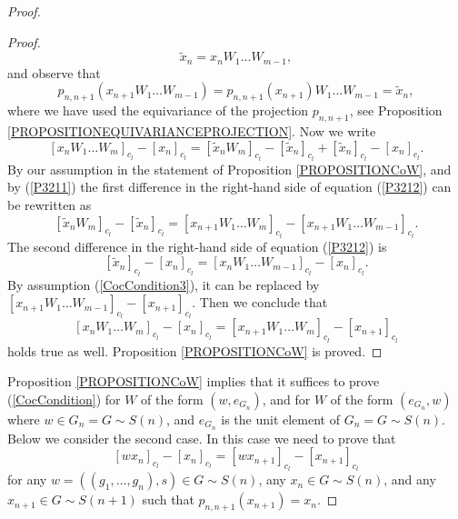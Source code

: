\documentclass[12pt]{amsart}
\theoremstyle{definition}
\numberwithin{equation}{section}
\begin{document}
\begin{proof}
\begin{proof}
$$
\tilde{x}_n=x_nW_1\ldots W_{m-1},
$$
and observe that
\begin{equation}\label{P3211}
p_{n,n+1}\left(x_{n+1}W_1\ldots W_{m-1}\right)=p_{n,n+1}\left(x_{n+1}\right)W_1\ldots W_{m-1}=\tilde{x}_n,
\end{equation}
where we have used the equivariance of the projection $p_{n,n+1}$, see Proposition \ref{PROPOSITIONEQUIVARIANCEPROJECTION}. Now we write
\begin{equation}\label{P3212}
\left[x_nW_1\ldots W_{m}\right]_{c_l}-\left[x_n\right]_{c_l}=\left[\tilde{x}_nW_m\right]_{c_l}-\left[\tilde{x}_n\right]_{c_l}+\left[\tilde{x}_n\right]_{c_l}-\left[x_n\right]_{c_l}.
\end{equation}
By our assumption in the statement of  Proposition \ref{PROPOSITIONCoW}, and by (\ref{P3211}) the first difference in the right-hand side of equation (\ref{P3212}) can be rewritten as
\begin{equation}\label{P3213}
\left[\tilde{x}_nW_m\right]_{c_l}-\left[\tilde{x}_n\right]_{c_l}=\left[x_{n+1}W_1\ldots W_m\right]_{c_l}-\left[x_{n+1}W_1\ldots W_{m-1}\right]_{c_l}.
\end{equation}
The second difference in the right-hand side of equation (\ref{P3212}) is
\begin{equation}\label{P3214}
\left[\tilde{x}_n\right]_{c_l}-\left[x_n\right]_{c_l}=\left[x_nW_1\ldots W_{m-1}\right]_{c_l}-\left[x_n\right]_{c_l}.
\end{equation}
By assumption (\ref{CocCondition3}), it can be replaced by $\left[x_{n+1}W_1\ldots W_{m-1}\right]_{c_l}-\left[x_{n+1}\right]_{c_l}$. Then we conclude that
$$
\left[x_nW_1\ldots W_{m}\right]_{c_l}-\left[x_n\right]_{c_l}=\left[x_{n+1}W_1\ldots W_{m}\right]_{c_l}-\left[x_{n+1}\right]_{c_l}
$$
holds true as well. Proposition \ref{PROPOSITIONCoW} is proved.
\end{proof}
Proposition \ref{PROPOSITIONCoW} implies that it suffices to prove (\ref{CocCondition})
for $W$ of the form $\left(w,e_{G_n}\right)$, and for $W$ of the form $\left(e_{G_n},w\right)$
where $w\in G_n=G\sim S(n)$, and $e_{G_n}$ is the unit element of $G_n=G\sim S(n)$. Below we consider the second case. In this case we need to prove that
\begin{equation}
\left[wx_n\right]_{c_l}-\left[x_n\right]_{c_l}=\left[wx_{n+1}\right]_{c_l}-\left[x_{n+1}\right]_{c_l}
\end{equation}
for any $w=\left(\left(g_1,\ldots,g_n\right),s\right)\in G\sim S(n)$, any $x_n\in G\sim S(n)$, and any $x_{n+1}\in G\sim S(n+1)$ such that $p_{n,n+1}\left(x_{n+1}\right)=x_n$.

\end{proof}
\end{document}

